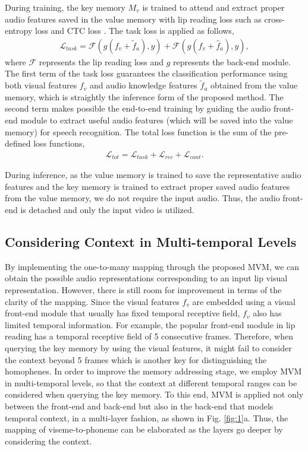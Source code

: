 \documentclass[letterpaper]{article} \usepackage{aaai22}  \usepackage{times}  \usepackage{helvet}  \usepackage{courier}  \usepackage[hyphens]{url}  \usepackage{graphicx} \urlstyle{rm} \def\UrlFont{\rm}  \usepackage{natbib}  \usepackage{caption} \DeclareCaptionStyle{ruled}{labelfont=normalfont,labelsep=colon,strut=off} \frenchspacing  \setlength{\pdfpagewidth}{8.5in}  \setlength{\pdfpageheight}{11in}  \usepackage{algorithm}
\begin{document}
During training, the key memory $M_v$ is trained to attend and extract proper audio features saved in the value memory with lip reading loss such as cross-entropy loss and CTC loss \cite{graves2006ctc}. The task loss is applied as follows,
\begin{align}
    \mathcal{L}_{task} = \mathcal{F}(g(f_v + \tilde{f}_a), y) + \mathcal{F}(g(f_v + \hat{f}_a), y),
\end{align}
where $\mathcal{F}$ represents the lip reading loss and $g$ represents the back-end module. The first term of the task loss guarantees the classification performance using both visual features $f_v$ and audio knowledge features $\tilde{f}_a$ obtained from the value memory, which is straightly the inference form of the proposed method. The second term makes possible the end-to-end training by guiding the audio front-end module to extract useful audio features (which will be saved into the value memory) for speech recognition.
The total loss function is the sum of the pre-defined loss functions,
\begin{align}
    \mathcal{L}_{tot} = \mathcal{L}_{task} + \mathcal{L}_{rec} + \mathcal{L}_{cont}.
\end{align}

During inference, as the value memory is trained to save the representative audio features and the key memory is trained to extract proper saved audio features from the value memory, we do not require the input audio. Thus, the audio front-end is detached and only the input video is utilized.

\subsection{Considering Context in Multi-temporal Levels}
By implementing the one-to-many mapping through the proposed MVM, we can obtain the possible audio representations corresponding to an input lip visual representation. However, there is still room for improvement in terms of the clarity of the mapping. Since the visual features $f_v$ are embedded using a visual front-end module that usually has fixed temporal receptive field, $f_v$ also has limited temporal information. For example, the popular front-end module \cite{petridis2017resnetlstm} in lip reading has a temporal receptive field of 5 consecutive frames. Therefore, when querying the key memory by using the visual features, it might fail to consider the context beyond 5 frames which is another key for distinguishing the homophenes. In order to improve the memory addressing stage, we employ MVM in multi-temporal levels, so that the context at different temporal ranges can be considered when querying the key memory. To this end, MVM is applied not only between the front-end and back-end but also in the back-end that models temporal context, in a multi-layer fashion, as shown in Fig. \ref{fig:1}a. Thus, the mapping of viseme-to-phoneme can be elaborated as the layers go deeper by considering the context.
\end{document}
